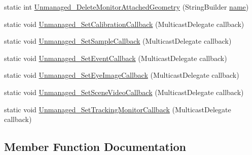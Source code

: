 \begin{DoxyCompactItemize}
\item 
static int \hyperlink{class_web_analyzer_1_1_eye_tracking_1_1_eye_tracking_controller_ab74dd311c26696870a55a3c46dcd154f}{Unmanaged\+\_\+\+Delete\+Monitor\+Attached\+Geometry} (String\+Builder \hyperlink{_u_i_2_h_t_m_l_resources_2js_2src_2create__experiment_8js_adac2bcb4f01b574cbc63fe8ee2c56bf0}{name})
\item 
static void \hyperlink{class_web_analyzer_1_1_eye_tracking_1_1_eye_tracking_controller_a3d01bc8585657ce26a4d0da0c0e4869c}{Unmanaged\+\_\+\+Set\+Calibration\+Callback} (Multicast\+Delegate callback)
\item 
static void \hyperlink{class_web_analyzer_1_1_eye_tracking_1_1_eye_tracking_controller_a6fc648481b2ff9195aa2506b4a5b2c73}{Unmanaged\+\_\+\+Set\+Sample\+Callback} (Multicast\+Delegate callback)
\item 
static void \hyperlink{class_web_analyzer_1_1_eye_tracking_1_1_eye_tracking_controller_ab04e26f47c782538e0838dcf2b58fa09}{Unmanaged\+\_\+\+Set\+Event\+Callback} (Multicast\+Delegate callback)
\item 
static void \hyperlink{class_web_analyzer_1_1_eye_tracking_1_1_eye_tracking_controller_acaff6bcefc00fbbf3595686d2650438d}{Unmanaged\+\_\+\+Set\+Eye\+Image\+Callback} (Multicast\+Delegate callback)
\item 
static void \hyperlink{class_web_analyzer_1_1_eye_tracking_1_1_eye_tracking_controller_a7bfc737e6966e52e75e3a9d5bb867720}{Unmanaged\+\_\+\+Set\+Scene\+Video\+Callback} (Multicast\+Delegate callback)
\item 
static void \hyperlink{class_web_analyzer_1_1_eye_tracking_1_1_eye_tracking_controller_a8e852cf8f14f6c52e94ffeb8a74b2a71}{Unmanaged\+\_\+\+Set\+Tracking\+Monitor\+Callback} (Multicast\+Delegate callback)
\end{DoxyCompactItemize}


\subsection{Member Function Documentation}
\hypertarget{class_web_analyzer_1_1_eye_tracking_1_1_eye_tracking_controller_afe1ed106a76e89624985ce65488f5406}{}
